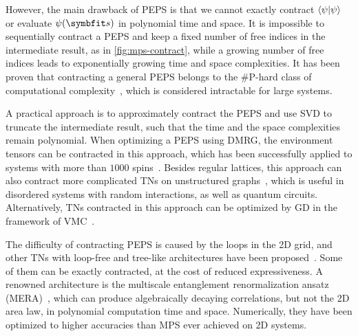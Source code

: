 However, the main drawback of PEPS is that we cannot exactly contract $\ip{\psi}$ or evaluate $\psi(\vs)$ in polynomial time and space. It is impossible to sequentially contract a PEPS and keep a fixed number of free indices in the intermediate result, as in \cref{fig:mps-contract}, while a growing number of free indices leads to exponentially growing time and space complexities. It has been proven that contracting a general PEPS belongs to the \#P-hard class of computational complexity~\cite{schuch2007computational}, which is considered intractable for large systems.

A practical approach is to approximately contract the PEPS and use SVD to truncate the intermediate result, such that the time and the space complexities remain polynomial. When optimizing a PEPS using DMRG, the environment tensors can be contracted in this approach, which has been successfully applied to systems with more than $1000$ spins~\cite{stoudenmire2012annual, lubasch2014algorithms, vanderstraeten2022variational}. Besides regular lattices, this approach can also contract more complicated TNs on unstructured graphs~\cite{jermyn2020automatic, pan2020contracting, sahu2022efficient}, which is useful in disordered systems with random interactions, as well as quantum circuits. Alternatively, TNs contracted in this approach can be optimized by GD in the framework of VMC~\cite{schuch2008simulation, mezzacapo2009ground, vanderstraeten2016gradient}.

The difficulty of contracting PEPS is caused by the loops in the 2D grid, and other TNs with loop-free and tree-like architectures have been proposed~\cite{shi2006classical, silvi2010homogeneous, cheng2019tree, felser2021efficient}. Some of them can be exactly contracted, at the cost of reduced expressiveness. A renowned architecture is the multiscale entanglement renormalization ansatz (MERA)~\cite{vidal2007entanglement, qian2022tree}, which can produce algebraically decaying correlations, but not the 2D area law, in polynomial computation time and space. Numerically, they have been optimized to higher accuracies than MPS ever achieved on 2D systems.
